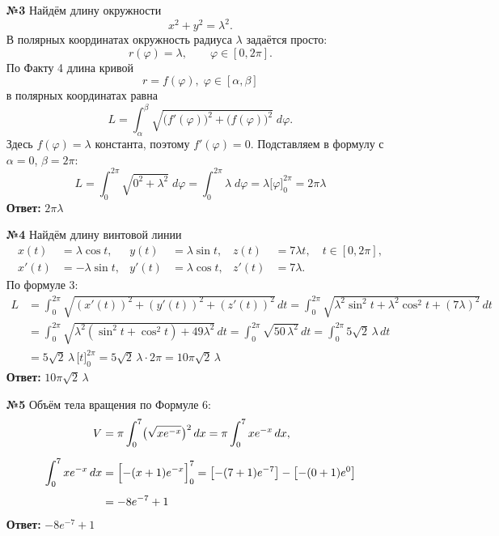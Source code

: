 \documentclass[a4paper]{article}
\renewcommand{\phi}{\varphi}
\begin{document}
\begin{enumerate}
  \item[\textbf{№3}]Найдём длину окружности
  $$
  x^2 + y^2 = \lambda^2.
  $$
  В полярных координатах окружность радиуса $\lambda$ задаётся просто:
  $$
  r( \phi)=\lambda,\qquad  \phi\in[0,2\pi].
  $$
  По Факту 4 длина кривой
  $$
  r=f( \phi),\; \phi\in[\alpha,\beta]
  $$
  в полярных координатах равна
  $$
  L=\int_{\alpha}^{\beta}\sqrt{\bigl(f'( \phi)\bigr)^2+\bigl(f( \phi)\bigr)^2}\;d \phi.
  $$
  Здесь \(f( \phi)=\lambda\) константа, поэтому \(f'( \phi)=0\). Подставляем в формулу с \(\alpha=0\), \(\beta=2\pi\):  
  $$
  L
  =\int_{0}^{2\pi}\sqrt{0^2+\lambda^2}\;d \phi
  =\int_{0}^{2\pi}\lambda\;d \phi
  =\lambda\bigl[ \phi\bigr]_{0}^{2\pi}
  =2\pi\lambda
  $$
  \textbf{Ответ: }$2\pi\lambda$\\

  \item[\textbf{№4}]Найдём длину винтовой линии
  \[
  \begin{aligned}
  x(t) &= \lambda \cos t, & y(t) &= \lambda \sin t, & z(t) &= 7\lambda t, 
  \quad t\in[0,2\pi], \\[6pt]
  x'(t) &= -\lambda \sin t, & y'(t) &= \lambda \cos t, & z'(t) &= 7\lambda.
  \end{aligned}
  \]
  По формуле 3:
  \[
  \begin{aligned}
  L &= \int_{0}^{2\pi} \sqrt{(x'(t))^2 + (y'(t))^2 + (z'(t))^2}\,dt
    = \int_{0}^{2\pi} \sqrt{\lambda^2\sin^2t + \lambda^2\cos^2t + (7\lambda)^2}\,dt \\[6pt]
    &= \int_{0}^{2\pi} \sqrt{\lambda^2(\sin^2t + \cos^2t) + 49\lambda^2}\,dt
    = \int_{0}^{2\pi} \sqrt{50\,\lambda^2}\,dt
    = \int_{0}^{2\pi} 5\sqrt{2}\,\lambda \,dt \\[6pt]
    &= 5\sqrt{2}\,\lambda \,\bigl[t\bigr]_{0}^{2\pi}
    = 5\sqrt{2}\,\lambda \cdot 2\pi
    = 10\pi\sqrt{2}\,\lambda
  \end{aligned}
  \]
  \textbf{Ответ: } $10\pi\sqrt{2}\,\lambda$\\

  \item[\textbf{№5}]Объём тела вращения по Формуле 6:
    \[
  \begin{aligned}
  V &= \pi \int_{0}^{7} \bigl(\sqrt{x e^{-x}}\bigr)^2 \,dx 
        = \pi \int_{0}^{7} x e^{-x} \,dx, \\[6pt]
  \int_{0}^{7} x e^{-x}\,dx 
    &= \Bigl[-(x+1)e^{-x}\Bigr]_{0}^{7}
      = \bigl[-(7+1)e^{-7}\bigr] - \bigl[-(0+1)e^{0}\bigr] \\[4pt]
    &= -8e^{-7} + 1
  \end{aligned}
  \]
  \textbf{Ответ: } $-8e^{-7} + 1$\\


\end{enumerate}
\end{document}
